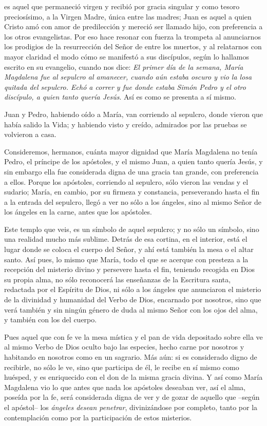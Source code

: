 \begin{body}
 es aquel que permaneció virgen y recibió por gracia singular y como tesoro preciosísimo, a la Virgen Madre, única entre las madres; Juan es aquel a quien Cristo amó con amor de predilección y mereció ser llamado hijo, con preferencia a los otros evangelistas. Por eso hace resonar con fuerza la trompeta al anunciarnos los prodigios de la resurrección del Señor de entre los muertos, y al relatarnos con mayor claridad el modo cómo se manifestó a sus discípulos, según lo hallamos escrito en su evangelio, cuando nos dice: \textit{El primer día de la semana, María Magdalena fue al sepulcro al amanecer, cuando aún estaba oscuro y vio la losa quitada del sepulcro. Echó a correr y fue donde estaba Simón Pedro y el otro discípulo, a quien tanto quería Jesús}. Así es como se presenta a sí mismo.

Juan y Pedro, habiendo oído a María, van corriendo al sepulcro, donde vieron que había salido la Vida; y habiendo visto y creído, admirados por las pruebas se volvieron a casa.

Consideremos, hermanos, cuánta mayor dignidad que María Magdalena no tenía Pedro, el príncipe de los apóstoles, y el mismo Juan, a quien tanto quería Jesús, y sin embargo ella fue considerada digna de una gracia tan grande, con preferencia a ellos. Porque los apóstoles, corriendo al sepulcro, sólo vieron las vendas y el sudario; María, en cambio, por su firmeza y constancia, perseverando hasta el fin a la entrada del sepulcro, llegó a ver no sólo a los ángeles, sino al mismo Señor de los ángeles en la carne, antes que los apóstoles.

Este templo que veis, es un símbolo de aquel sepulcro; y no sólo un símbolo, sino una realidad mucho más sublime. Detrás de esa cortina, en el interior, está el lugar donde se coloca el cuerpo del Señor, y ahí está también la mesa o el altar santo. Así pues, lo mismo que María, todo el que se acerque con presteza a la recepción del misterio divino y persevere hasta el fin, teniendo recogida en Dios su propia alma, no sólo reconocerá las enseñanzas de la Escritura santa, redactada por el Espíritu de Dios, ni sólo a los ángeles que anunciaron el misterio de la divinidad y humanidad del Verbo de Dios, encarnado por nosotros, sino que verá también y sin ningún género de duda al mismo Señor con los ojos del alma, y también con los del cuerpo.

Pues aquel que con fe ve la mesa mística y el pan de vida depositado sobre ella ve al mismo Verbo de Dios oculto bajo las especies, hecho carne por nosotros y habitando en nosotros como en un sagrario. Más aún: si es considerado digno de recibirle, no sólo le ve, sino que participa de él, le recibe en sí mismo como huésped, y es enriquecido con el don de la misma gracia divina. Y así como María Magdalena vio lo que antes que nada los apóstoles deseaban ver, así el alma, poseída por la fe, será considerada digna de ver y de gozar de aquello que –según el apóstol– los \textit{ángeles desean penetrar}, divinizándose por completo, tanto por la contemplación como por la participación de estos misterios.
\end{body}

